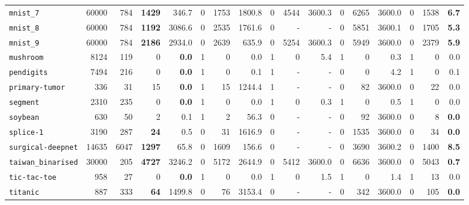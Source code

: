 \begin{tabular}{lccrrrrrrrrrrrrrr}
\texttt{mnist\_7} & \multicolumn{1}{r}{60000} & \multicolumn{1}{r}{784}  & \textbf{1429} & 346.7 & 0 & 1753 & 1800.8 & 0 & 4544 & 3600.3 & 0 & 6265 & 3600.0 & 0 & 1538 & \textbf{6.7}\\
\texttt{mnist\_8} & \multicolumn{1}{r}{60000} & \multicolumn{1}{r}{784}  & \textbf{1192} & 3086.6 & 0 & 2535 & 1761.6 & 0 & - & - & 0 & 5851 & 3600.1 & 0 & 1705 & \textbf{5.3}\\
\texttt{mnist\_9} & \multicolumn{1}{r}{60000} & \multicolumn{1}{r}{784}  & \textbf{2186} & 2934.0 & 0 & 2639 & 635.9 & 0 & 5254 & 3600.3 & 0 & 5949 & 3600.0 & 0 & 2379 & \textbf{5.9}\\
\texttt{mushroom} & \multicolumn{1}{r}{8124} & \multicolumn{1}{r}{119}  & 0 & \textbf{0.0} & 1 & 0 & 0.0 & 1 & 0 & 5.4 & 1 & 0 & 0.3 & 1 & 0 & 0.0\\
\texttt{pendigits} & \multicolumn{1}{r}{7494} & \multicolumn{1}{r}{216}  & 0 & \textbf{0.0} & 1 & 0 & 0.1 & 1 & - & - & 0 & 0 & 4.2 & 1 & 0 & 0.1\\
\texttt{primary-tumor} & \multicolumn{1}{r}{336} & \multicolumn{1}{r}{31}  & 15 & \textbf{0.0} & 1 & 15 & 1244.4 & 1 & - & - & 0 & 82 & 3600.0 & 0 & 22 & 0.0\\
\texttt{segment} & \multicolumn{1}{r}{2310} & \multicolumn{1}{r}{235}  & 0 & \textbf{0.0} & 1 & 0 & 0.0 & 1 & 0 & 0.3 & 1 & 0 & 0.5 & 1 & 0 & 0.0\\
\texttt{soybean} & \multicolumn{1}{r}{630} & \multicolumn{1}{r}{50}  & 2 & 0.1 & 1 & 2 & 56.3 & 0 & - & - & 0 & 92 & 3600.0 & 0 & 8 & \textbf{0.0}\\
\texttt{splice-1} & \multicolumn{1}{r}{3190} & \multicolumn{1}{r}{287}  & \textbf{24} & 0.5 & 0 & 31 & 1616.9 & 0 & - & - & 0 & 1535 & 3600.0 & 0 & 34 & \textbf{0.0}\\
\texttt{surgical-deepnet} & \multicolumn{1}{r}{14635} & \multicolumn{1}{r}{6047}  & \textbf{1297} & 65.8 & 0 & 1609 & 156.6 & 0 & - & - & 0 & 3690 & 3600.2 & 0 & 1400 & \textbf{8.5}\\
\texttt{taiwan\_binarised} & \multicolumn{1}{r}{30000} & \multicolumn{1}{r}{205}  & \textbf{4727} & 3246.2 & 0 & 5172 & 2644.9 & 0 & 5412 & 3600.0 & 0 & 6636 & 3600.0 & 0 & 5043 & \textbf{0.7}\\
\texttt{tic-tac-toe} & \multicolumn{1}{r}{958} & \multicolumn{1}{r}{27}  & 0 & \textbf{0.0} & 1 & 0 & 0.0 & 1 & 0 & 1.5 & 1 & 0 & 1.4 & 1 & 13 & 0.0\\
\texttt{titanic} & \multicolumn{1}{r}{887} & \multicolumn{1}{r}{333}  & \textbf{64} & 1499.8 & 0 & 76 & 3153.4 & 0 & - & - & 0 & 342 & 3600.0 & 0 & 105 & \textbf{0.0}\\

\end{tabular}
